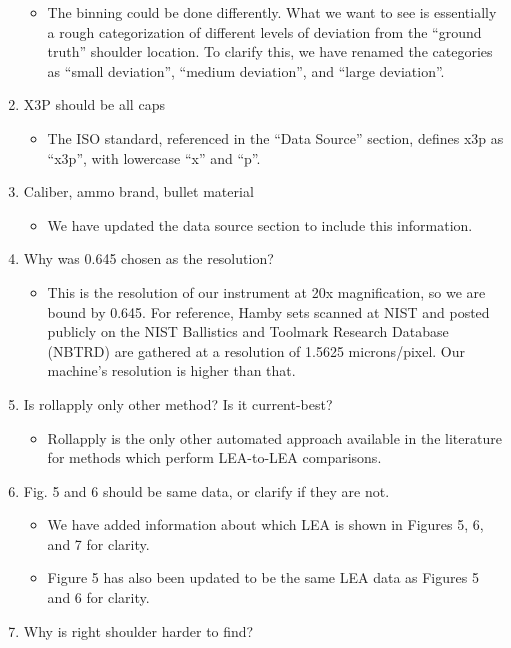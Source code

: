 \documentclass[12pt]{article}
\providecommand{\tightlist}{%
  \setlength{\itemsep}{0pt}\setlength{\parskip}{0pt}}
\begin{document}
\begin{enumerate}
  \begin{itemize}
  \tightlist
  \item
    The binning could be done differently. What we want to see is
    essentially a rough categorization of different levels of deviation
    from the ``ground truth'' shoulder location. To clarify this, we
    have renamed the categories as ``small deviation'', ``medium
    deviation'', and ``large deviation''.
  \end{itemize}
\item
  X3P should be all caps

  \begin{itemize}
  \tightlist
  \item
    The ISO standard, referenced in the ``Data Source'' section, defines
    x3p as ``x3p'', with lowercase ``x'' and ``p''.
  \end{itemize}
\item
  Caliber, ammo brand, bullet material

  \begin{itemize}
  \tightlist
  \item
    We have updated the data source section to include this information.
  \end{itemize}
\item
  Why was 0.645 chosen as the resolution?

  \begin{itemize}
  \tightlist
  \item
    This is the resolution of our instrument at 20x magnification, so we
    are bound by 0.645. For reference, Hamby sets scanned at NIST and
    posted publicly on the NIST Ballistics and Toolmark Research
    Database (NBTRD) are gathered at a resolution of 1.5625
    microns/pixel. Our machine's resolution is higher than that.
  \end{itemize}
\item
  Is rollapply only other method? Is it current-best?

  \begin{itemize}
  \tightlist
  \item
    Rollapply is the only other automated approach available in the
    literature for methods which perform LEA-to-LEA comparisons.
  \end{itemize}
\item
  Fig. 5 and 6 should be same data, or clarify if they are not.

  \begin{itemize}
  \tightlist
  \item
    We have added information about which LEA is shown in Figures 5, 6,
    and 7 for clarity.
  \item
    Figure 5 has also been updated to be the same LEA data as Figures 5
    and 6 for clarity.\\
  \end{itemize}
\item
  Why is right shoulder harder to find?


\end{enumerate}
\end{document}

